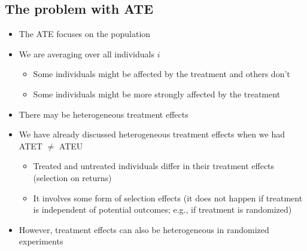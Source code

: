 \documentclass[10pt]{article}
\begin{document}
\subsection{The problem with ATE}
\begin{itemize}
    \item The ATE focuses on the population 
    \item We are averaging over all individuals $i $
    \begin{itemize}
        \item Some individuals might be affected by the treatment and others don't
        \item Some individuals might be more strongly affected by the treatment
    \end{itemize}
    \item There may be heterogeneous treatment effects 
    \item We have already discussed heterogeneous treatment effects when we had ATET $\neq $ ATEU
    \begin{itemize}
        \item Treated and untreated individuals differ in their treatment effects (selection on returns)
        \item It involves some form of selection effects (it does not happen if treatment is independent of potential outcomes; e.g., if treatment is randomized)
    \end{itemize}
    \item However, treatment effects can also be heterogeneous in randomized experiments
\end{itemize}
\end{document}
